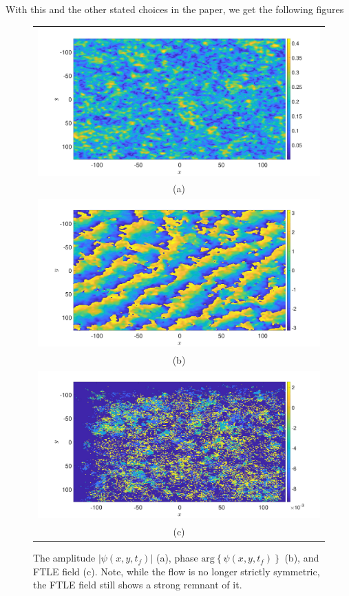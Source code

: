 \documentclass[a4paper,11pt]{article}
\begin{document}
With this and the other stated choices in the paper, we get the following figures 
\begin{figure}
\centering
\begin{tabular}{c}
\includegraphics[width=.7\textwidth]{amplitude_K_128_Lx_128_tf_1pt5e4} \\
(a) \\
\includegraphics[width=.7\textwidth]{phase_K_128_Lx_128_tf_1pt5e4} \\
 (b) \\
\includegraphics[width=.7\textwidth]{ftle_K_128_Lx_128_tf_1pt5e4} \\
(c)
\end{tabular}
\caption{The amplitude $\left|\psi(x,y,t_{f})\right|$ (a), phase $\mbox{arg}\left\{\psi(x,y,t_{f})\right\}$ (b), and FTLE field (c).  Note, while the flow is no longer strictly symmetric, the FTLE field still shows a strong remnant of it.}
\end{figure}
\end{document}
